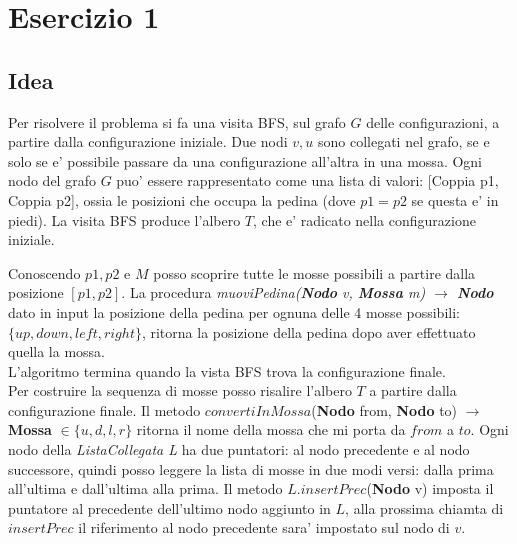 \section*{Esercizio 1}

\subsection{Idea}
Per risolvere il problema si fa una visita BFS, sul grafo $G$ delle configurazioni, a partire dalla configurazione iniziale.
Due nodi $v,u$ sono collegati nel grafo, se e solo se e' possibile passare da una configurazione all'altra in una mossa.
Ogni nodo del grafo $G$ puo' essere rappresentato come una lista di valori: [Coppia p1, Coppia p2],
ossia le posizioni che occupa la pedina (dove $p1=p2$ se questa e' in piedi). 
La visita BFS produce l'albero $T$, che e' radicato nella configurazione iniziale.

Conoscendo $p1,p2$ e $M$ posso scoprire tutte le mosse possibili a partire dalla posizione $[p1,p2]$.
La procedura \emph{muoviPedina(\textbf{Nodo} v, \textbf{Mossa} m) $\to$ \textbf{Nodo}} dato in input la posizione della pedina
per ognuna delle 4 mosse possibili: $\{up,down,left,right\}$, ritorna la posizione della pedina dopo aver effettuato 
quella la mossa. \\

L'algoritmo termina quando la vista BFS trova la configurazione finale.\\

Per costruire la sequenza di mosse posso risalire l'albero $T$ a partire dalla configurazione finale. Il metodo
$convertiInMossa$(\textbf{Nodo} from, \textbf{Nodo} to) $\to$ \textbf{Mossa} $\in \{u,d,l,r\}$ ritorna il nome 
della mossa che mi porta da $from$ a $to$.
Ogni nodo della \emph{ListaCollegata L} ha due puntatori: al nodo precedente e al nodo successore, quindi posso
leggere la lista di mosse in due modi versi: dalla prima all'ultima e dall'ultima alla prima.
Il metodo $L.insertPrec$(\textbf{Nodo} v) imposta il puntatore al precedente dell'ultimo nodo aggiunto in $L$,
alla prossima chiamta di $insertPrec$ il riferimento al nodo precedente sara' impostato sul nodo di $v$.

